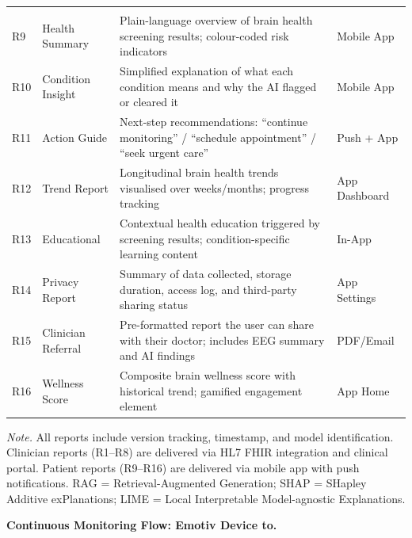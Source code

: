{\begin{xltabular}{\textwidth}{@{} >{\raggedright\arraybackslash}p{0.6cm} >{\raggedright\arraybackslash}p{3.0cm} L >{\raggedright\arraybackslash}p{2.2cm} @{}}
 \\
\addlinespace
R9 & Health Summary & Plain-language overview of brain health screening results; colour-coded risk indicators & Mobile App \\
\addlinespace
R10 & Condition Insight & Simplified explanation of what each condition means and why the AI flagged or cleared it & Mobile App \\
\addlinespace
R11 & Action Guide & Next-step recommendations: ``continue monitoring'' / ``schedule appointment'' / ``seek urgent care'' & Push + App \\
\addlinespace
R12 & Trend Report & Longitudinal brain health trends visualised over weeks/months; progress tracking & App Dashboard \\
\addlinespace
R13 & Educational & Contextual health education triggered by screening results; condition-specific learning content & In-App \\
\addlinespace
R14 & Privacy Report & Summary of data collected, storage duration, access log, and third-party sharing status & App Settings \\
\addlinespace
R15 & Clinician Referral & Pre-formatted report the user can share with their doctor; includes EEG summary and AI findings & PDF/Email \\
\addlinespace
R16 & Wellness Score & Composite brain wellness score with historical trend; gamified engagement element & App Home \\
\end{xltabular}}
\vspace{0.5em}
\noindent\textit{Note.} All reports include version tracking, timestamp, and model identification. Clinician reports (R1--R8) are delivered via HL7 FHIR integration and clinical portal. Patient reports (R9--R16) are delivered via mobile app with push notifications. RAG = Retrieval-Augmented Generation; SHAP = SHapley Additive exPlanations; LIME = Local Interpretable Model-agnostic Explanations.
\fi %

\label{tab:report_types}




\noindent\textbf{Continuous Monitoring Flow: Emotiv Device to.}

